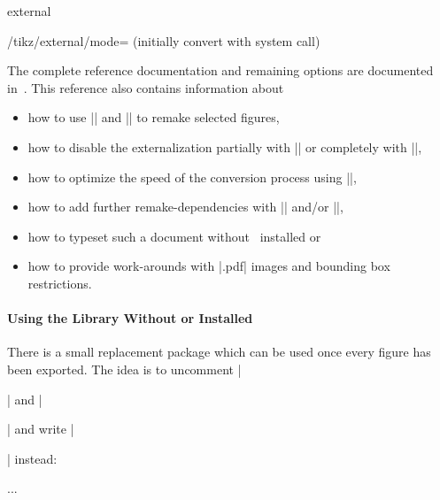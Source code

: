 {\begin{pgfplotslibrary}{external}
\begin{key}{/tikz/external/mode= (initially convert with system call)}
\end{key}

The complete reference documentation and remaining options are documented in~\cite[``Externalization Library'']{tikz}. This reference also contains information about
\begin{itemize}
	\item how to use || and || to remake selected figures,
	\item how to disable the externalization partially with || or completely with |\tikzexternaldisable|,
	\item how to optimize the speed of the conversion process using |\tikzset{external/optimize command away=\myExpensiveMacro}|,
	\item how to add further remake-dependencies with |\tikzpicturedependsonfile| and/or  |\tikzexternalfiledependsonfile|,
	\item how to typeset such a document without \pgfname\ installed or
	\item how to provide work-arounds with |.pdf| images and bounding box restrictions.
\end{itemize}

\paragraph{Using the Library Without {\normalfont\pgfname} or {\normalfont\PGFPlots} Installed}
There is a small replacement package  which can be used once every figure has been exported. The idea is to uncomment |\usepackage{tikz}| and |\usepackage{pgfplots}| and write |\usepackage{tikzexternal}| instead:
\begin{codeexample}
\usepackage{tikzexternal}
\tikzexternalize%


...


\end{codeexample}
\end{pgfplotslibrary}}
